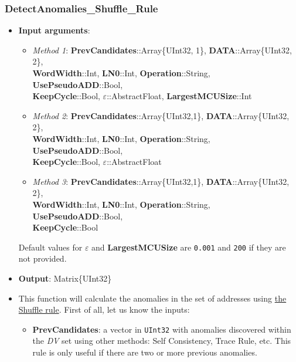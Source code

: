 \subsubsection*{DetectAnomalies\_Shuffle\_Rule}\label{Fun:DetectAnomaliesShuffleRule}
 \begin{itemize}
 	\item \textbf{Input arguments}: 
 		\begin{itemize}
 		\item \textit{Method 1}: \textbf{PrevCandidates}::Array\{UInt32, 1\}, \textbf{DATA}::Array\{UInt32, 2\}, \\ \textbf{WordWidth}::Int, \textbf{LN0}::Int,  \textbf{Operation}::String, \textbf{UsePseudoADD}::Bool, \\ \textbf{KeepCycle}::Bool, \textbf{\(\varepsilon\)}::AbstractFloat, \textbf{LargestMCUSize}::Int
%
		\item \textit{Method 2}:
			\textbf{PrevCandidates}::Array\{UInt32,1\}, \textbf{DATA}::Array\{UInt32, 2\}, \\ \textbf{WordWidth}::Int, \textbf{LN0}::Int,  \textbf{Operation}::String, \textbf{UsePseudoADD}::Bool, \\  \textbf{KeepCycle}::Bool, \textbf{\(\varepsilon\)}::AbstractFloat
		\item \textit{Method 3}: 			%
			\textbf{PrevCandidates}::Array\{UInt32,1\}, \textbf{DATA}::Array\{UInt32, 2\}, \\ \textbf{WordWidth}::Int, \textbf{LN0}::Int,  \textbf{Operation}::String, \textbf{UsePseudoADD}::Bool, \\ \textbf{KeepCycle}::Bool
 		\end{itemize}
 		Default values for \textbf{\(\varepsilon\)} and \textbf{LargestMCUSize} are \texttt{0.001} and \texttt{200} if they are not provided.
 		\item \textbf{Output}: Matrix\{UInt32\}
 		\item This function will calculate the anomalies in the set of addresses using \hyperref[Subsec:ShuffleRule]{the Shuffle rule}. 
 		First of all, let us know the inputs:
 		\begin{itemize}
 			
 			\item \textbf{PrevCandidates}: a vector in \texttt{UInt32} with anomalies discovered within the \textit{DV} set using other methods: Self Consistency, Trace Rule, etc. This rule is only useful if there are two or more previous anomalies. 
 			

\end{itemize}
\end{itemize}

